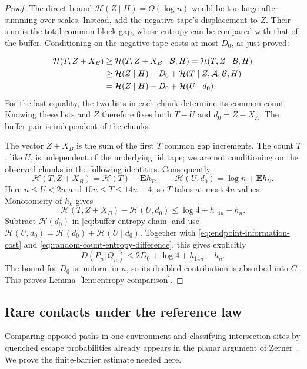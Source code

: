 \begin{proof}
The direct bound $\mathcal H(Z\mid H)=O(\log n)$ would be too
large after summing over scales.  Instead, add the negative tape's
displacement to $Z$.  Their sum is the total common-block gap, whose
entropy can be compared with that of the buffer.  Conditioning on
the negative tape costs at most $D_0$, as just proved:

\begin{align}
 \mathcal H(T,Z+X_B)
 &\ge \mathcal H(T,Z+X_B\mid\mathcal B,H)
  =\mathcal H(T,Z\mid\mathcal B,H)\notag\\
 &\ge \mathcal H(Z\mid H)-D_0
       +\mathcal H(T\mid Z,\mathcal A,\mathcal B,H)\notag\\
 &=\mathcal H(Z\mid H)-D_0+\mathcal H(U\mid d_0).
 \label{eq:buffer-entropy-chain}
\end{align}
For the last equality, the two lists in each chunk determine its common
count.  Knowing these lists and $Z$ therefore fixes both $T-U$ and
$d_0=Z-X_A$.  The buffer pair is independent of the chunks.

The vector $Z+X_B$ is the sum of the first $T$ common gap increments.
The count $T$, like $U$, is independent of the underlying iid tape;
we are not conditioning on the observed chunks in the following
identities.  Consequently
\[
 \mathcal H(T,Z+X_B)=\mathcal H(T)+\mathbf E h_T,
 \qquad
 \mathcal H(U,d_0)=\log n+\mathbf E h_U.
\]
Here $n\le U<2n$ and $10n\le T\le14n-4$, so $T$ takes at most $4n$
values.  Monotonicity of $h_k$ gives
\begin{equation}\label{eq:random-count-entropy-difference}
 \mathcal H(T,Z+X_B)-\mathcal H(U,d_0)
 \le\log4+h_{14n}-h_n.
\end{equation}
Subtract $\mathcal H(d_0)$ in \eqref{eq:buffer-entropy-chain} and use
$\mathcal H(U,d_0)=\mathcal H(d_0)+\mathcal H(U\mid d_0)$.
Together with \eqref{eq:endpoint-information-cost} and
\eqref{eq:random-count-entropy-difference}, this gives explicitly
\[
 D(P_n\Vert Q_n)\le 2D_0+\log4+h_{14n}-h_n.
\]
The bound for $D_0$ is uniform in $n$, so its doubled contribution
is absorbed into $C$.  This proves
Lemma~\ref{lem:entropy-comparison}.
\end{proof}

\subsection{Rare contacts under the reference law}

Comparing opposed paths in one environment and classifying intersection
sites by quenched escape probabilities already appears in the planar
argument of Zerner~\cite[Section~2]{Zerner2007}. We prove the finite-barrier
estimate needed here.


